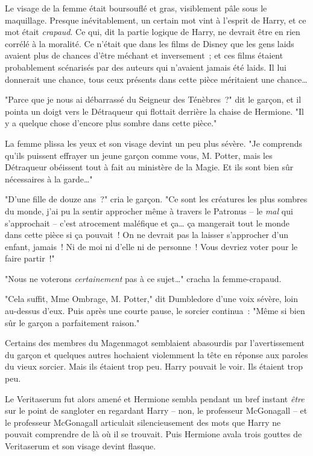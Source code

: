 Le visage de la femme était boursouflé et gras, visiblement pâle sous le maquillage. Presque inévitablement, un certain mot vint à l'esprit de Harry, et ce mot était \emph{crapaud}. Ce qui, dit la partie logique de Harry, ne devrait être en rien corrélé à la moralité. Ce n'était que dans les films de Disney que les gens laids avaient plus de chances d'être méchant et inversement~; et ces films étaient probablement scénarisés par des auteurs qui n'avaient jamais été laids. Il lui donnerait une chance, tous ceux présents dans cette pièce méritaient une chance…

"Parce que je nous ai débarrassé du Seigneur des Ténèbres~?" dit le garçon, et il pointa un doigt vers le Détraqueur qui flottait derrière la chaise de Hermione. "Il y a quelque chose d'encore plus sombre dans cette pièce."

La femme plissa les yeux et son visage devint un peu plus sévère. "Je comprends qu'ils puissent effrayer un jeune garçon comme vous, M. Potter, mais les Détraqueur obéissent tout à fait au ministère de la Magie. Et ils sont bien sûr nécessaires à la garde…"

"D'une fille de douze ans~?" cria le garçon. "Ce sont les créatures les plus sombres du monde, j'ai pu la sentir approcher même à travers le Patronus -- le \emph{mal} qui s'approchait -- c'est atrocement maléfique et ça… ça mangerait tout le monde dans cette pièce si ça pouvait~! On ne devrait pas la laisser s'approcher d'un enfant, jamais~! Ni de moi ni d'elle ni de personne~! Vous devriez voter pour le faire partir~!"

"Nous ne voterons \emph{certainement} pas à ce sujet…" cracha la femme-crapaud.

"Cela suffit, Mme Ombrage, M. Potter," dit Dumbledore d'une voix sévère, loin au-dessus d'eux. Puis après une courte pause, le sorcier continua~: "Même si bien sûr le garçon a parfaitement raison."

Certains des membres du Magenmagot semblaient abasourdis par l'avertissement du garçon et quelques autres hochaient violemment la tête en réponse aux paroles du vieux sorcier. Mais ils étaient trop peu. Harry pouvait le voir. Ils étaient trop peu.

Le Veritaserum fut alors amené et Hermione sembla pendant un bref instant \emph{être} sur le point de sangloter en regardant Harry -- non, le professeur McGonagall -- et le professeur McGonagall articulait silencieusement des mots que Harry ne pouvait comprendre de là où il se trouvait. Puis Hermione avala trois gouttes de Veritaserum et son visage devint flasque.

